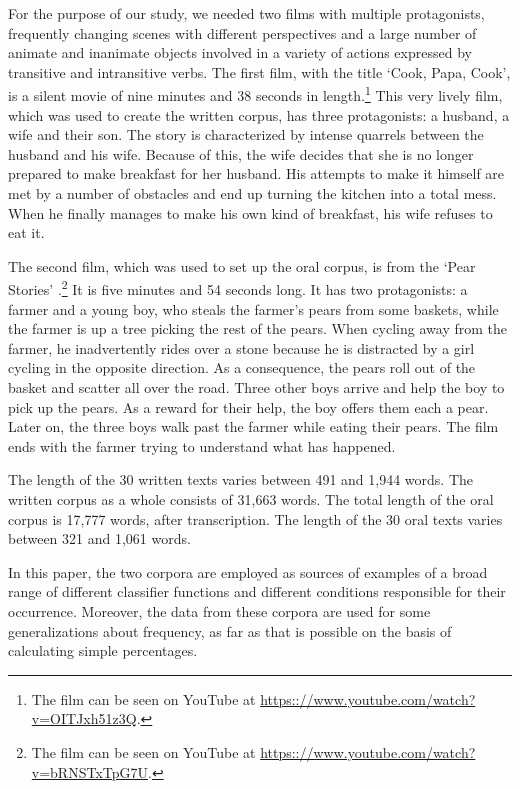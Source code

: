 \documentclass[output=paper]{langsci/langscibook}
\begin{document}
For the purpose of our study, we needed two films with multiple protagonists, frequently changing scenes with different perspectives and a large number of animate and inanimate objects involved in a variety of actions expressed by transitive and intransitive verbs. The first film, with the title `Cook, Papa, Cook', is a silent movie of nine minutes and 38 seconds in length.\footnote{The film can be seen on YouTube at {\url{https:://www.youtube.com/watch?v=OITJxh51z3Q}}.} This very lively film, which was used to create the written corpus, has three protagonists: a husband, a wife and their son. The story is characterized by intense quarrels between the husband and his wife. Because of this, the wife decides that she is no longer prepared to make breakfast for her husband. His attempts to make it himself are met by a number of obstacles and end up turning the kitchen into a total mess. When he finally manages to make his own kind of breakfast, his wife refuses to eat it.

The second film, which was used to set up the oral corpus, is from the `Pear Stories' \citep{chafe:80}.\footnote{The film can be seen on YouTube at {\url{https:://www.youtube.com/watch?v=bRNSTxTpG7U}}.} It is five minutes and 54 seconds long. It has two protagonists: a farmer and a young boy, who steals the farmer's pears from some baskets, while the farmer is up a tree picking the rest of the pears. When cycling away from the farmer, he inadvertently rides over a stone because he is distracted by a girl cycling in the opposite direction. As a consequence, the pears roll out of the basket and scatter all over the road. Three other boys arrive and help the boy to pick up the pears. As a reward for their help, the boy offers them each a pear. Later on, the three boys walk past the farmer while eating their pears. The film ends with the farmer trying to understand what has happened.

The length of the 30 written texts varies between 491 and 1,944 words. The written corpus as a whole consists of 31,663 words. The total length of the oral corpus is 17,777 words, after transcription. The length of the 30 oral texts varies between 321 and 1,061 words.

\largerpage
In this paper, the two corpora are employed as sources of examples of a broad range of different classifier functions and different conditions responsible for their occurrence. Moreover, the data from these corpora are used for some generalizations about frequency, as far as that is possible on the basis of calculating simple percentages.
\end{document}
